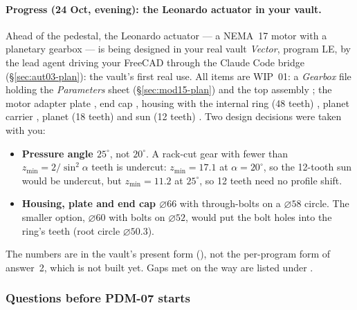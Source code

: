 \paragraph{Progress (24 Oct, evening): the Leonardo actuator in your vault.} Ahead of the pedestal, the Leonardo
actuator --- a NEMA~17 motor with a planetary gearbox --- is being designed in your real vault \emph{Vector}, program
LE, by the lead agent driving your FreeCAD through the Claude Code bridge (\S\ref{sec:aut03-plan}): the vault's first
real use. All items are WIP~01: a \emph{Gearbox} file holding the \emph{Parameters} sheet (\S\ref{sec:mod15-plan}) and
the top assembly ; the motor adapter plate , end cap ,
housing with the internal ring (48 teeth) , planet carrier , planet (18 teeth)
 and sun (12 teeth) . Two design decisions were taken with you:
\begin{itemize}[nosep]
  \item \textbf{Pressure angle $25^\circ$}, not $20^\circ$. A rack-cut gear with fewer than
        $z_{\min} = 2/\sin^2\alpha$ teeth is undercut: $z_{\min} = 17.1$ at $\alpha = 20^\circ$, so the 12-tooth sun
        would be undercut, but $z_{\min} = 11.2$ at $25^\circ$, so 12 teeth need no profile shift.
  \item \textbf{Housing, plate and end cap $\varnothing 66$} with through-bolts on a $\varnothing 58$ circle. The smaller
        option, $\varnothing 60$ with bolts on $\varnothing 52$, would put the bolt holes into the ring's teeth (root
        circle $\varnothing 50.3$).
\end{itemize}
The numbers are in the vault's present form (), not the per-program  form of
answer~2, which is not built yet. Gaps met on the way are listed under .

\subsubsection*{Questions before PDM-07 starts}

